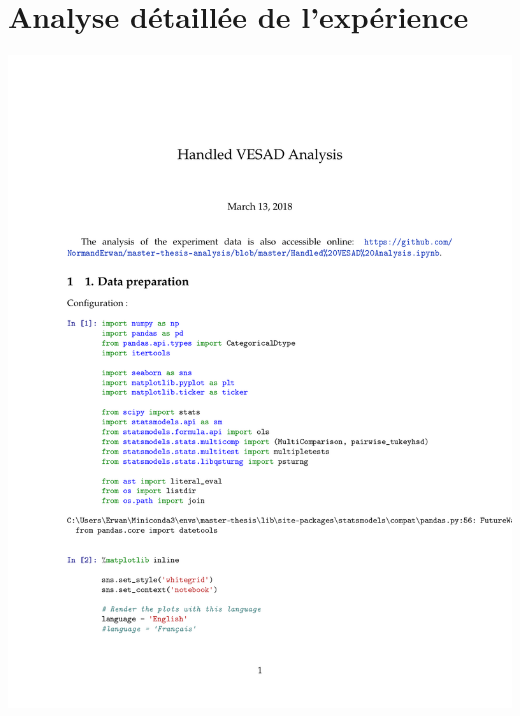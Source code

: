 \chapter{Analyse détaillée de l'expérience}
\label{annex:experiment_analysis}

\includegraphics[page=1, scale=0.75, trim={0 0.5cm 0 3.5cm}, clip]{content/9_experiment_analysis.pdf}
